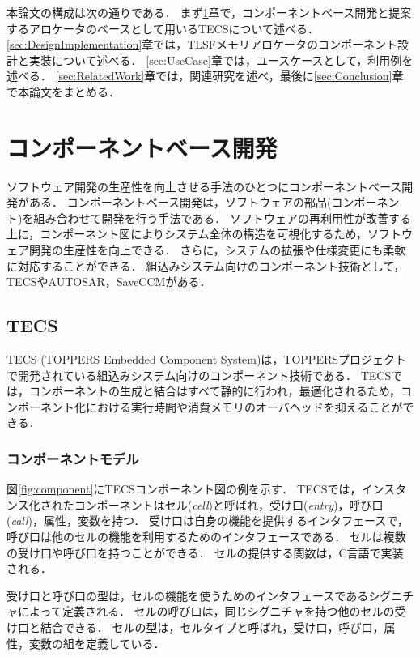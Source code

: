 \documentclass[submit,techrep]{ipsj_v2/UTF8/ipsj}
\begin{document}
本論文の構成は次の通りである．
まず\ref{sec:ComponentBasedDevelopment}章で，コンポーネントベース開発と提案するアロケータのベースとして用いるTECSについて述べる．
\ref{sec:DesignImplementation}章では，TLSFメモリアロケータのコンポーネント設計と実装について述べる．
\ref{sec:UseCase}章では，ユースケースとして，利用例を述べる．
\ref{sec:RelatedWork}章では，関連研究を述べ，最後に\ref{sec:Conclusion}章で本論文をまとめる．

\section{コンポーネントベース開発}
\label{sec:ComponentBasedDevelopment}

ソフトウェア開発の生産性を向上させる手法のひとつにコンポーネントベース開発がある\cite{par:Crnkovic}\cite{par:CBD}．
コンポーネントベース開発は，ソフトウェアの部品(コンポーネント)を組み合わせて開発を行う手法である．
ソフトウェアの再利用性が改善する上に，コンポーネント図によりシステム全体の構造を可視化するため，ソフトウェア開発の生産性を向上できる．
さらに，システムの拡張や仕様変更にも柔軟に対応することができる．
組込みシステム向けのコンポーネント技術として，TECSやAUTOSAR\cite{url:AUTOSAR}，SaveCCM\cite{par:SaveCCM}がある．

\subsection{TECS}
TECS (TOPPERS Embedded Component System)は，TOPPERSプロジェクト\cite{url:TOPPERS}で開発されている組込みシステム向けのコンポーネント技術である．
TECSでは，コンポーネントの生成と結合はすべて静的に行われ，最適化されるため，コンポーネント化における実行時間や消費メモリのオーバヘッドを抑えることができる．

\subsubsection{コンポーネントモデル}
図\ref{fig:component}にTECSコンポーネント図の例を示す．
TECSでは，インスタンス化されたコンポーネントはセル({\it cell})と呼ばれ，受け口({\it entry})，呼び口({\it call})，属性，変数を持つ．
受け口は自身の機能を提供するインタフェースで，呼び口は他のセルの機能を利用するためのインタフェースである．
セルは複数の受け口や呼び口を持つことができる．
セルの提供する関数は，C言語で実装される．

受け口と呼び口の型は，セルの機能を使うためのインタフェースであるシグニチャによって定義される．
セルの呼び口は，同じシグニチャを持つ他のセルの受け口と結合できる．
セルの型は，セルタイプと呼ばれ，受け口，呼び口，属性，変数の組を定義している．
\end{document}

